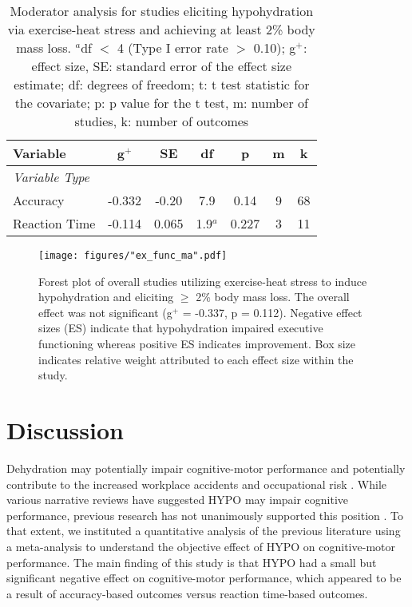 \begin{table}
	\caption{Moderator analysis for studies eliciting hypohydration via exercise-heat stress and achieving at least 2\% body mass loss. ${^a}$df ${<}$ 4 (Type I error rate ${>}$ 0.10); g${^+}$: effect size, SE: standard error of the effect size estimate; df: degrees of freedom; t: t test statistic for the covariate; p: p value for the t test, m: number of studies, k: number of outcomes}
	\centering
	\begin{tabular}{lcccccc} 
		\hline
		\textbf{Variable} & \textbf{g${^+}$} & \textbf{SE} & \textbf{df} & \textbf{p} & \textbf{m} & 
		\textbf{k} \\
		\hline
		\textit{Variable Type} &&&&&& \\
		Accuracy & -0.332 & -0.20 & 7.9 & 0.14 & 9 & 68 \\
		Reaction Time & -0.114 & 0.065 & 1.9${^a}$ & 0.227 & 3 & 11 \\
		\hline		    
	\end{tabular}
	\label{tbl:ehs_2_moderators}
\end{table}


\begin{figure}
	\texttt{[image: figures/"ex\_func\_ma".pdf]}
	\caption{Forest plot of overall studies utilizing exercise-heat stress to induce hypohydration and eliciting ${\ge}$ 2\% body mass loss. The overall effect was not significant (g${^+}$ = -0.337, p = 0.112). Negative effect sizes (ES) indicate that hypohydration impaired executive functioning whereas positive ES indicates improvement. Box size indicates relative weight attributed to each effect size within the study.}
	\label{fig:ehs_forest_plot}
\end{figure}


\section{Discussion}
Dehydration may potentially impair cognitive-motor performance and potentially contribute to the increased workplace accidents and occupational risk \cite{kenefick_hydration_2007}. While various narrative reviews have suggested HYPO may impair cognitive performance, previous research has not unanimously supported this position \cite{cheuvront_dehydration:_2014}. To that extent, we instituted a quantitative analysis of the previous literature using a meta-analysis to understand the objective effect of HYPO on cognitive-motor performance. The main finding of this study is that HYPO had a small but significant negative effect on cognitive-motor performance, which appeared to be a result of accuracy-based outcomes versus reaction time-based outcomes.


